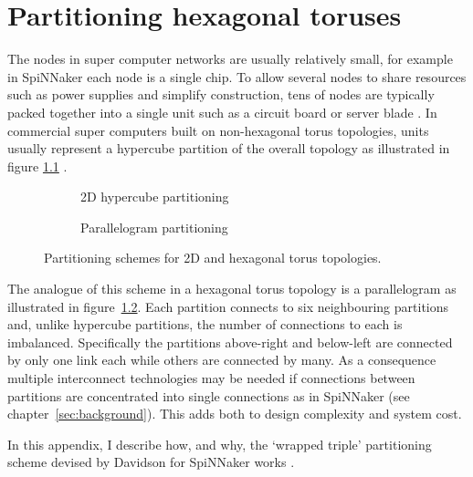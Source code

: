 \chapter{Partitioning hexagonal toruses}
	
	\label{sec:partitioning}
	
	The nodes in super computer networks are usually relatively small, for
	example in SpiNNaker each node is a single chip. To allow several nodes to
	share resources such as power supplies and simplify construction, tens of
	nodes are typically packed together into a single unit such as a circuit
	board or server blade \cite{gilge14,ajima12}. In commercial super computers
	built on non-hexagonal torus topologies, units usually represent a hypercube
	partition of the overall topology as illustrated in figure
	\ref{fig:apdx-hypercube-partitioning} \cite{chen11,ajima12}.
	
	\begin{figure}
		\center
		\begin{subfigure}[b]{0.45\textwidth}
			\center
			\caption{2D hypercube partitioning}
			\label{fig:apdx-hypercube-partitioning}
		\end{subfigure}
		\begin{subfigure}[b]{0.45\textwidth}
			\center
			\caption{Parallelogram partitioning}
			\label{fig:apdx-parallelogram-partitioning}
		\end{subfigure}
		
		\caption{Partitioning schemes for 2D and hexagonal torus topologies.}
		\label{fig:apdx-partitioning-options}
	\end{figure}
	
	
	The analogue of this scheme in a hexagonal torus topology is a parallelogram
	as illustrated in figure~\ref{fig:apdx-parallelogram-partitioning}.  Each
	partition connects to six neighbouring partitions and, unlike hypercube
	partitions, the number of connections to each is imbalanced.  Specifically
	the partitions above-right and below-left are connected by only one link each
	while others are connected by many. As a consequence multiple interconnect
	technologies may be needed if connections between partitions are concentrated
	into single connections as in SpiNNaker (see chapter~\ref{sec:background}).
	This adds both to design complexity and system cost.
	
	In this appendix, I describe how, and why, the `wrapped triple' partitioning
	scheme devised by Davidson for SpiNNaker works \cite{davidsonWiring}.
	
